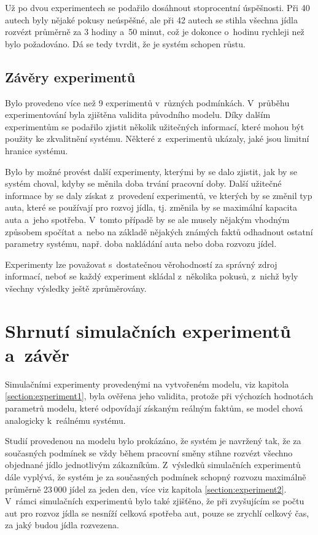 \documentclass[a4paper, 11pt]{article}
\begin{document}
	Už po dvou experimentech se podařilo dosáhnout stoprocentní úspěšnosti. Při
	40 autech byly nějaké pokusy neúspěšné, ale při 42 autech se stihla všechna
	jídla rozvézt průměrně za 3 hodiny a~50 minut, což je dokonce o~hodinu
	rychleji než bylo požadováno. Dá se tedy tvrdit, že je systém schopen růstu.


	\subsection{Závěry experimentů}

	Bylo provedeno více než 9 experimentů v~různých podmínkách. V~průběhu
	experimentování byla zjištěna validita původního modelu. Díky dalším
	experimentům se podařilo zjistit několik užitečných informací, které
	mohou být použity ke zkvalitnění systému. Některé z~experimentů ukázaly,
	jaké jsou limitní hranice systému.

	Bylo by možné provést další experimenty, kterými by se dalo zjistit,
	jak by se systém choval, kdyby se měnila doba trvání pracovní doby.
	Další užitečné informace by se daly získat z~provedení experimentů,
	ve kterých by se změnil typ auta, které se používají pro rozvoj jídla,
	tj. změnila by se maximální kapacita auta a~jeho spotřeba. V~tomto
	případě by se ale musely nějakým vhodným způsobem spočítat a~nebo na
	základě nějakých známých faktů odhadnout ostatní parametry systému, např.
	doba nakládání auta nebo doba rozvozu jídel.

	Experimenty lze považovat s~dostatečnou věrohodností za správný zdroj
	informací, neboť se každý experiment skládal z~několika pokusů, z~nichž
	byly všechny výsledky ještě zprůměrovány.



	\section{Shrnutí simulačních experimentů a~závěr}

	Simulačními experimenty provedenými na vytvořeném modelu, viz
	kapitola \ref{section:experiment1}, byla ověřena jeho validita, protože
	při výchozích hodnotách parametrů modelu, které odpovídají získaným
	reálným faktům, se model chová analogicky k~reálnému systému.

	Studií provedenou na modelu bylo prokázáno, že systém je navržený
	tak, že za současných podmínek se vždy během pracovní směny stihne
	rozvézt všechno objednané jídlo jednotlivým zákazníkům. Z~výsledků
	simulačních experimentů dále vyplývá, že systém je za současných
	podmínek schopný rozvozu maximálně průměrně 23\,000 jídel za jeden den,
	více viz kapitola \ref{section:experiment2}. V~rámci simulačních
	experimentů bylo také zjišťěno, že při zvyšujícím se počtu aut pro
	rozvoz jídla se nesníží celková spotřeba aut, pouze se zrychlí celkový
	čas, za jaký budou jídla rozvezena.
\end{document}
